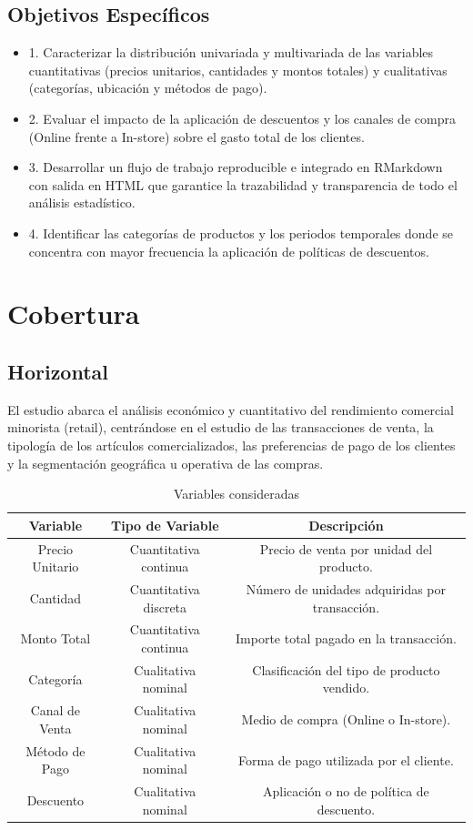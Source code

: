 \documentclass[oneside,11pt]{Latex/Classes/PhDthesisPSnPDF}
\begin{document}
\subsection{Objetivos Específicos}
\begin{itemize}
  \item{1. Caracterizar la distribución univariada y multivariada de las variables cuantitativas (precios unitarios, cantidades y montos totales) y cualitativas (categorías, ubicación y métodos de pago).}
  \item{2. Evaluar el impacto de la aplicación de descuentos y los canales de compra (Online frente a In-store) sobre el gasto total de los clientes.}
  \item{3. Desarrollar un flujo de trabajo reproducible e integrado en RMarkdown con salida en HTML que garantice la trazabilidad y transparencia de todo el análisis estadístico.}
  \item{4. Identificar las categorías de productos y los periodos temporales donde se concentra con mayor frecuencia la aplicación de políticas de descuentos.}
\end{itemize}

\section{Cobertura}

\subsection{Horizontal}

El estudio abarca el análisis económico y cuantitativo del rendimiento
comercial minorista (retail), centrándose en el estudio de las
transacciones de venta, la tipología de los artículos comercializados,
las preferencias de pago de los clientes y la segmentación geográfica u
operativa de las compras.\\

\begin{table}[ht]
\centering
\caption{Variables consideradas} 
\resizebox{10cm}{!} {
\begin{tabular}{ccc}
  \hline
\textbf{Variable} & \textbf{Tipo de Variable} & \textbf{Descripción} \\\hline
Precio Unitario & Cuantitativa continua & Precio de venta por unidad del producto. \\
Cantidad & Cuantitativa discreta & Número de unidades adquiridas por transacción. \\
Monto Total & Cuantitativa continua & Importe total pagado en la transacción. \\
Categoría & Cualitativa nominal & Clasificación del tipo de producto vendido. \\
Canal de Venta & Cualitativa nominal & Medio de compra (Online o In-store). \\
Método de Pago & Cualitativa nominal & Forma de pago utilizada por el cliente. \\
Descuento & Cualitativa nominal & Aplicación o no de política de descuento. \\ 
\hline
\end{tabular}
}
\end{table}
\end{document}
